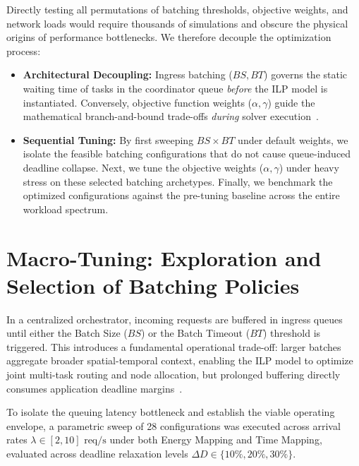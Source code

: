Directly testing all permutations of batching thresholds, objective weights, and network loads would require thousands of simulations and obscure the physical origins of performance bottlenecks. We therefore decouple the optimization process:
\begin{itemize}
    \item \textbf{Architectural Decoupling:} Ingress batching ($BS, BT$) governs the static waiting time of tasks in the coordinator queue \textit{before} the ILP model is instantiated. Conversely, objective function weights ($\alpha, \gamma$) guide the mathematical branch-and-bound trade-offs \textit{during} solver execution~\cite{wolsey1998integer, boyd2004convex}.
    \item \textbf{Sequential Tuning:} By first sweeping $BS \times BT$ under default weights, we isolate the feasible batching configurations that do not cause queue-induced deadline collapse. Next, we tune the objective weights ($\alpha, \gamma$) under heavy stress on these selected batching archetypes. Finally, we benchmark the optimized configurations against the pre-tuning baseline across the entire workload spectrum.
\end{itemize}

\section{\texorpdfstring{Macro-Tuning: Exploration and Selection of Batching Policies}{Macro-Tuning: Exploration and Selection of Batching Policies (BS x BT)}}
\label{sec:batching_exploration}

In a centralized orchestrator, incoming requests are buffered in ingress queues until either the Batch Size ($BS$) or the Batch Timeout ($BT$) threshold is triggered. This introduces a fundamental operational trade-off: larger batches aggregate broader spatial-temporal context, enabling the ILP model to optimize joint multi-task routing and node allocation, but prolonged buffering directly consumes application deadline margins~\cite{icdcs_satellite_2025}.

To isolate the queuing latency bottleneck and establish the viable operating envelope, a parametric sweep of 28 configurations was executed across arrival rates $\lambda \in [2, 10]\text{ req/s}$ under both Energy Mapping and Time Mapping, evaluated across deadline relaxation levels $\Delta D \in \{10\%, 20\%, 30\%\}$.

